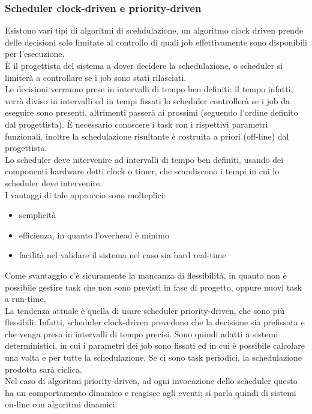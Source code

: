 \documentclass[12pt, oneside]{extbook}
\begin{document}
\subsubsection{Scheduler clock-driven e priority-driven}
Esistono vari tipi di algoritmi di scehdulazione, un algoritmo clock driven prende delle decisioni solo limitate al controllo di quali job effettivamente sono disponibili per l'esecuzione.\\ È il progettista del sistema a dover decidere la schedulazione, o scheduler si limiterà a controllare se i job sono stati rilasciati.\\ Le decisioni verranno prese in intervalli di tempo ben definiti: il tempo infatti, verrà diviso in intervalli ed in tempi fissati lo scheduler controllerà se i job da eseguire sono presenti, altrimenti passerà ai prossimi (seguendo l'ordine definito dal progettista). È necessario conoscere i task con i rispettivi parametri funzionali, inoltre la schedulazione risultante è costruita a priori (off-line) dal progettista.\\ Lo scheduler deve intervenire ad intervalli di tempo ben definiti, usando dei componenti hardware detti clock o timer, che scandiscono i tempi in cui lo scheduler deve intervenire.\\ I vantaggi di tale approccio sono molteplici:
\begin{itemize}
\item semplicità
\item efficienza, in quanto l'overhead è minimo
\item facilità nel validare il sistema nel caso sia hard real-time
\end{itemize}
Come svantaggio c'è sicuramente la mancanza di flessibilità, in quanto non è possibile gestire task che non sono previsti in fase di progetto, oppure nuovi task a run-time.\\ La tendenza attuale è quella di usare scheduler priority-driven, che sono più flessibili. Infatti, scheduler clock-driven prevedono che la decisione sia prefissata e che venga presa in intervalli di tempo precisi. Sono quindi adatti a sistemi deterministici, in cui i parametri dei job sono fissati ed in cui è possibile calcolare una volta e per tutte la schedulazione. Se ci sono task periodici, la schedulazione prodotta sarà ciclica.\\ Nel caso di algoritmi priority-driven, ad ogni invocazione dello scheduler questo ha un comportamento dinamico e reagisce agli eventi; si parla quindi di sistemi on-line con algoritmi dinamici.
\end{document}
